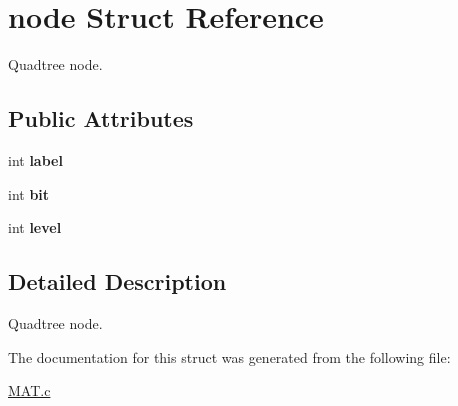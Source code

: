 \hypertarget{structnode}{}\section{node Struct Reference}
\label{structnode}


Quadtree node.  


\subsection*{Public Attributes}
\begin{DoxyCompactItemize}
\item 
\mbox{\label{structnode_a964cbb51357a791bf72d51d353e86be7}} 
int {\bfseries label}
\item 
\mbox{\label{structnode_a4e87cbc8748d74dab3bd9982f96bf11b}} 
int {\bfseries bit}
\item 
\mbox{\label{structnode_a3871d43e823ba9542b052912d01709dd}} 
int {\bfseries level}
\end{DoxyCompactItemize}


\subsection{Detailed Description}
Quadtree node. 

The documentation for this struct was generated from the following file\+:\begin{DoxyCompactItemize}
\item 
\hyperlink{MAT_8c}{M\+A\+T.\+c}\end{DoxyCompactItemize}
